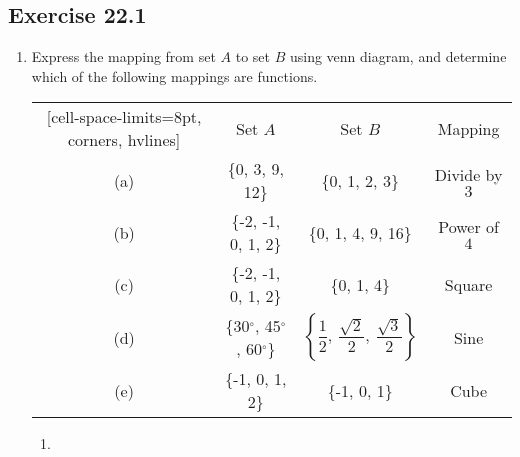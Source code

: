 \documentclass[12pt]{report}
\begin{document}
\singlespacing{}

\doublespacing{}
\tableofcontents
\singlespacing{}
\newpage

\subsection*{Exercise 22.1}

\begin{enumerate}
    \item Express the mapping from set $A$ to set $B$ using venn diagram, and determine
          which of the following mappings are functions.

          \begin{center}
              \begin{NiceTabular}{|c|c|c|c|}[cell-space-limits=8pt, corners, hvlines]
                  & Set $A$                                & Set $B$                                                                   & Mapping       \\
                  (a) & \{0, 3, 9, 12\}                        & \{0, 1, 2, 3\}                                                            & Divide by $3$ \\
                  (b) & \{-2, -1, 0, 1, 2\}                    & \{0, 1, 4, 9, 16\}                                                        & Power of $4$  \\
                  (c) & \{-2, -1, 0, 1, 2\}                    & \{0, 1, 4\}                                                               & Square        \\
                  (d) & \{30$^\circ$, 45$^\circ$, 60$^\circ$\} & $\left\{\dfrac{1}{2},\ \dfrac{\sqrt{2}}{2},\ \dfrac{\sqrt{3}}{2}\right\}$ & Sine          \\
                  (e) & \{-1, 0, 1, 2\}                        & \{-1, 0, 1\}                                                              & Cube          \\
              \end{NiceTabular}
          \end{center}

          \sol{}

          \setlength{\columnseprule}{1pt}
          \setlength{\columnsep}{24pt}

          \begin{multicols}{2}

              \begin{enumerate}[label=(\alph*)]
                  \item {}
\end{enumerate}
\end{multicols}
\end{enumerate}
\end{document}
